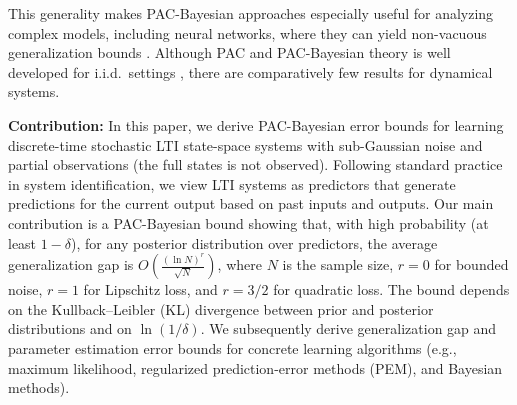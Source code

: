 \documentclass{article}
\begin{document}
This generality makes PAC-Bayesian approaches especially useful for analyzing complex models, including neural networks, where they can yield non-vacuous generalization bounds \cite{Dziugaite2017}.
Although PAC and PAC-Bayesian theory is well developed for i.i.d.\ settings \cite{shalev2014understanding,alquier2021userfriendly,guedj2019primer}, there are comparatively few results for dynamical systems.
\par
   \textbf{Contribution:}
    In this paper, we derive PAC-Bayesian error bounds for learning discrete-time stochastic LTI state-space systems with sub-Gaussian noise and partial observations (the full states is not observed). 
    Following standard practice in system identification, we view LTI systems as predictors that generate predictions for the current output based on past inputs and outputs.
    Our main contribution is a PAC-Bayesian bound showing that, with high probability (at least $1-\delta$), for any posterior distribution over predictors, the average generalization gap is $O(\frac{(\ln N)^r}{\sqrt{N}})$, where $N$ is the sample size, $r=0$ for bounded noise, $r=1$ for Lipschitz loss, and $r=3/2$ for quadratic loss. The bound depends on the Kullback--Leibler (KL) divergence between prior and posterior distributions and on $\ln(1/\delta)$. We subsequently derive generalization gap and parameter estimation error bounds for concrete learning algorithms (e.g., maximum likelihood, regularized prediction-error methods (PEM), and Bayesian methods).
\end{document}
